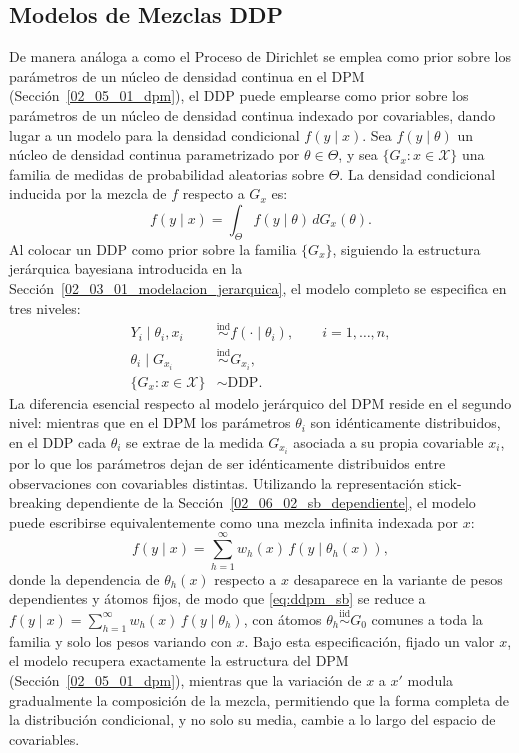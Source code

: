 \subsection{Modelos de Mezclas DDP}
\label{02_06_03_mezclas_ddp}
De manera análoga a como el Proceso de Dirichlet se emplea como prior sobre los parámetros de un núcleo de densidad continua en el DPM (Sección~\ref{02_05_01_dpm}), el DDP puede emplearse como prior sobre los parámetros de un núcleo de densidad continua indexado por covariables, dando lugar a un modelo para la densidad condicional $f(y \mid x)$. Sea $f(y \mid \theta)$ un núcleo de densidad continua parametrizado por $\theta \in \Theta$, y sea $\{G_x : x \in \mathcal{X}\}$ una familia de medidas de probabilidad aleatorias sobre $\Theta$. La densidad condicional inducida por la mezcla de $f$ respecto a $G_x$ es:
\begin{equation}
    f(y \mid x) = \int_\Theta f(y \mid \theta)\, dG_x(\theta).
\end{equation}
Al colocar un DDP como prior sobre la familia $\{G_x\}$, siguiendo la estructura jerárquica bayesiana introducida en la Sección~\ref{02_03_01_modelacion_jerarquica}, el modelo completo se especifica en tres niveles:
\begin{equation}\label{eq:ddpm_jerarquico}
\begin{aligned}
    Y_i \mid \theta_i, x_i &\overset{\mathrm{ind}}{\sim} f(\cdot \mid \theta_i),
    \qquad i = 1, \dots, n, \\
    \theta_i \mid G_{x_i} &\overset{\mathrm{ind}}{\sim} G_{x_i}, \\
    \{G_x : x \in \mathcal{X}\} &\sim \mathrm{DDP}.
\end{aligned}
\end{equation}
La diferencia esencial respecto al modelo jerárquico del DPM reside en el segundo nivel: mientras que en el DPM los parámetros $\theta_i$ son idénticamente distribuidos, en el DDP cada $\theta_i$ se extrae de la medida $G_{x_i}$ asociada a su propia covariable $x_i$, por lo que los parámetros dejan de ser idénticamente distribuidos entre observaciones con covariables distintas. Utilizando la representación stick-breaking dependiente de la Sección~\ref{02_06_02_sb_dependiente}, el modelo puede escribirse equivalentemente como una mezcla infinita indexada por $x$:
\begin{equation}\label{eq:ddpm_sb}
    f(y \mid x) = \sum_{h=1}^{\infty} w_h(x)\, f(y \mid \theta_h(x)),
\end{equation}
donde la dependencia de $\theta_h(x)$ respecto a $x$ desaparece en la variante de pesos dependientes y átomos fijos, de modo que \eqref{eq:ddpm_sb} se reduce a $f(y \mid x) = \sum_{h=1}^{\infty} w_h(x)\, f(y \mid \theta_h)$, con átomos $\theta_h \overset{\mathrm{iid}}{\sim} G_0$ comunes a toda la familia y solo los pesos variando con $x$. Bajo esta especificación, fijado un valor $x$, el modelo recupera exactamente la estructura del DPM (Sección~\ref{02_05_01_dpm}), mientras que la variación de $x$ a $x'$ modula gradualmente la composición de la mezcla, permitiendo que la forma completa de la distribución condicional, y no solo su media, cambie a lo largo del espacio de covariables.


